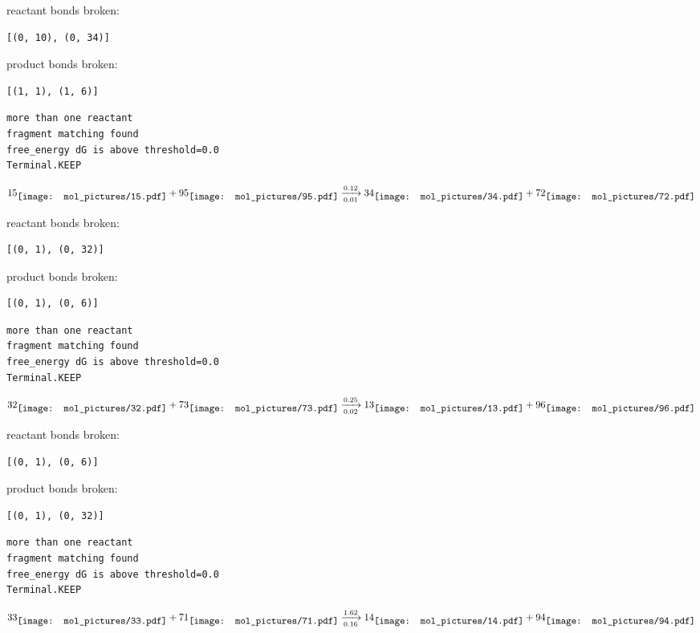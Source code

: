 \documentclass{article}
\begin{document}
reactant bonds broken:\begin{verbatim}
[(0, 10), (0, 34)]
\end{verbatim}
product bonds broken:\begin{verbatim}
[(1, 1), (1, 6)]
\end{verbatim}




\vspace{1cm}
\begin{verbatim}
more than one reactant
fragment matching found
free_energy dG is above threshold=0.0
Terminal.KEEP
\end{verbatim}
$$
15
\raisebox{-.5\height}{\texttt{[image: mol\_pictures/15.pdf]}}
+
95
\raisebox{-.5\height}{\texttt{[image: mol\_pictures/95.pdf]}}
\xrightarrow[0.01]{0.12}
34
\raisebox{-.5\height}{\texttt{[image: mol\_pictures/34.pdf]}}
+
72
\raisebox{-.5\height}{\texttt{[image: mol\_pictures/72.pdf]}}
$$


reactant bonds broken:\begin{verbatim}
[(0, 1), (0, 32)]
\end{verbatim}
product bonds broken:\begin{verbatim}
[(0, 1), (0, 6)]
\end{verbatim}




\vspace{1cm}
\begin{verbatim}
more than one reactant
fragment matching found
free_energy dG is above threshold=0.0
Terminal.KEEP
\end{verbatim}
$$
32
\raisebox{-.5\height}{\texttt{[image: mol\_pictures/32.pdf]}}
+
73
\raisebox{-.5\height}{\texttt{[image: mol\_pictures/73.pdf]}}
\xrightarrow[0.02]{0.25}
13
\raisebox{-.5\height}{\texttt{[image: mol\_pictures/13.pdf]}}
+
96
\raisebox{-.5\height}{\texttt{[image: mol\_pictures/96.pdf]}}
$$


reactant bonds broken:\begin{verbatim}
[(0, 1), (0, 6)]
\end{verbatim}
product bonds broken:\begin{verbatim}
[(0, 1), (0, 32)]
\end{verbatim}




\vspace{1cm}
\begin{verbatim}
more than one reactant
fragment matching found
free_energy dG is above threshold=0.0
Terminal.KEEP
\end{verbatim}
$$
33
\raisebox{-.5\height}{\texttt{[image: mol\_pictures/33.pdf]}}
+
71
\raisebox{-.5\height}{\texttt{[image: mol\_pictures/71.pdf]}}
\xrightarrow[0.16]{1.62}
14
\raisebox{-.5\height}{\texttt{[image: mol\_pictures/14.pdf]}}
+
94
\raisebox{-.5\height}{\texttt{[image: mol\_pictures/94.pdf]}}
$$
\end{document}
